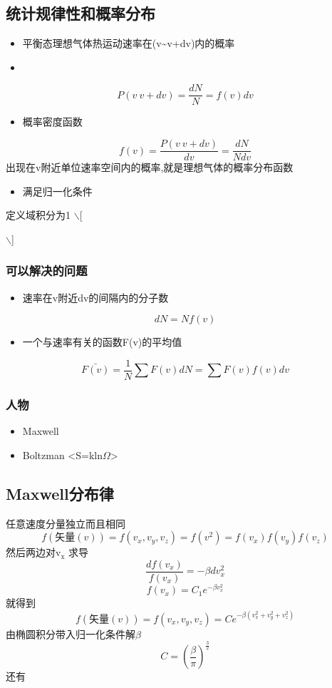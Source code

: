 \documentclass[11pt]{article}
\begin{document}
\subsection{统计规律性和概率分布}
\label{sec:orga83f9f5}
\begin{itemize}
\item 平衡态理想气体热运动速率在(v\textasciitilde{}v+dv)内的概率
\item 
\end{itemize}
\[
P(v~v+dv)=\frac{dN}{N}=f(v)dv
\]
\begin{itemize}
\item 概率密度函数
\end{itemize}
\[
f(v)=\frac{P(v~v+dv)}{dv}=\frac{dN}{Ndv}
\]
出现在v附近单位速率空间内的概率,就是理想气体的概率分布函数
\begin{itemize}
\item 满足归一化条件
\end{itemize}
定义域积分为1
$\backslash$[

$\backslash$]
\subsubsection{可以解决的问题}
\label{sec:orgd47439c}
\begin{itemize}
\item 速率在v附近dv的间隔内的分子数
\end{itemize}
\[
dN=Nf(v)
\]
\begin{itemize}
\item 一个与速率有关的函数F(v)的平均值
\end{itemize}
\[
\bar{F(v)}=\frac{1}{N}\sum F(v)dN =\sum F(v)f(v)dv
\]
\subsubsection{人物}
\label{sec:orgb140d7e}
\begin{itemize}
\item Maxwell
\item Boltzman <S=kln\(\Omega\)>
\end{itemize}
\subsection{Maxwell分布律}
\label{sec:orge7e9802}
任意速度分量独立而且相同
\[
f(矢量(v))=f(v_x ,v_y ,v_z )=f(v^2 )= f(v_x )f(v_y )f(v_z )
\]
然后两边对v\(_{\text{x}}\) 求导
\[
\frac{df(v_x )}{f(v_x )}=-\beta dv_x^2
\]
\[
f(v_x )=C_1 e^{-\beta v_x^2 }
\]
就得到
\[
f(矢量(v))=f(v_x ,v_y ,v_z )=Ce^{-\beta(v_x^2 + v_y^2 + v_z^2 )}
\]
由椭圆积分带入归一化条件解\(\beta\)
\[
C=(\frac{\beta}{\pi})^{\frac{3}{2}}
\]
还有
\end{document}
